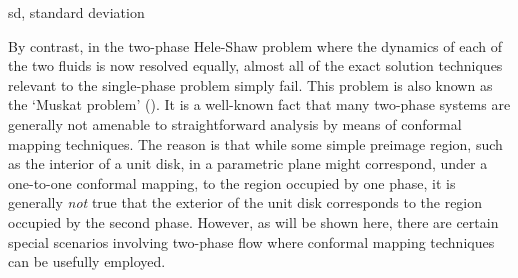 \documentclass{article}
\begin{document}
\begin{table}[t!]%
\vspace*{-14pt}
\caption{Log odds ratios (OR) from a Bayesian logistic regression on the best ML model for the Sarcoidosis study}
{\fontsize{6}{8}\selectfont\sffamily sd, standard deviation}\label{tab04}
\end{table}

By contrast, in the two-phase Hele-Shaw problem where the dynamics of each
of the two fluids is now resolved equally, almost all of the exact solution techniques relevant to the single-phase problem simply fail. This problem
is also known as the `Muskat problem' (\citealt{Muskat}). It is a well-known fact
that many two-phase systems are generally not amenable to straightforward
analysis by means of conformal mapping techniques. The reason is that while
some simple preimage region, such as the interior of a unit disk,  in a parametric
plane might correspond, under a one-to-one conformal mapping,  to the region
occupied by one phase, it is generally {\em not} true that the exterior of
the unit disk corresponds to the region occupied by the second phase. However,
as will be shown here, there are certain special scenarios involving two-phase
flow where conformal mapping techniques can be usefully employed.
\end{document}
